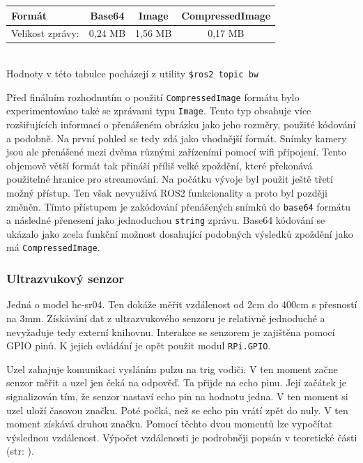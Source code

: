 \begin{center}
	\begin{tabular}{| l | c c c |}
		\hline
		Formát & Base64 & Image & CompressedImage \\ 
		\hline
		Velikost zprávy: & 0,24 MB & 1,56 MB & 0,17 MB  \\ 
		\hline 
	\end{tabular} \\ \vspace*{0.5em}
	Hodnoty v této tabulce pocházejí z utility \verb|$ros2 topic bw|
\end{center}

Před finálním rozhodnutím o použití \verb|CompressedImage| formátu bylo experimentováno také se zprávami typu \verb|Image|. Tento typ obsahuje více rozšiřujících informací o přenášeném obrázku jako jeho rozměry, použité kódování a podobně. Na první pohled se tedy zdá jako vhodnější formát. Snímky kamery jsou ale přenášené mezi dvěma různými zařízeními pomocí wifi připojení. Tento objemově větší formát tak přináší příliš velké zpoždění, které překonává použitelné hranice pro streamování. Na počátku vývoje byl použit ještě třetí možný přístup. Ten však nevyužívá ROS2 funkcionality a proto byl později změněn. Tímto přístupem je zakódování přenášených snímků do \verb|base64| formátu a následné přenesení jako jednoduchou \verb|string| zprávu. Base64 kódování se ukázalo jako zcela funkční možnost dosahující podobných výsledků zpoždění jako má \verb|CompressedImage|.
 
\subsubsection*{Ultrazvukový senzor} \label{implementation:ultrasonic}
Jedná o model hc-sr04. Ten dokáže měřit vzdálenost od 2cm do 400cm s přesností na 3mm. Získávání dat z ultrazvukového senzoru je relativně jednoduché a nevyžaduje tedy externí knihovnu. Interakce se senzorem je zajištěna pomocí GPIO pinů. K jejich ovládání je opět použit modul \verb|RPi.GPIO|. 

Uzel zahajuje komunikaci vysláním pulzu na trig vodiči. V ten moment začne senzor měřit a uzel jen čeká na odpověď. Ta přijde na echo pinu. Její začátek je signalizován tím, že senzor nastaví echo pin na hodnotu jedna. V ten moment si uzel uloží časovou značku. Poté počká, než se echo pin vrátí zpět do nuly. V ten moment získává druhou značku. Pomocí těchto dvou momentů lze vypočítat výslednou vzdálenost. Výpočet vzdálenosti je podrobněji popsán v teoretické části (str: \pageref{theory:ultrasonic}).

